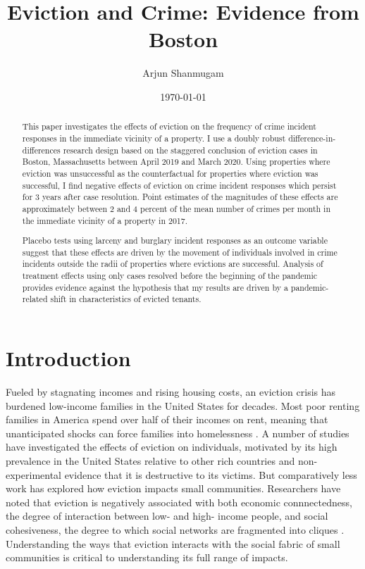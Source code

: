 \documentclass[12pt]{article}
\begin{document}
\begin{titlepage}
\title{Eviction and Crime: Evidence from Boston}
\author{Arjun Shanmugam}
\date{\today}
\maketitle
\begin{abstract}
\noindent This paper investigates the effects of eviction on the frequency of crime incident responses in the immediate vicinity of a property. I use a doubly robust difference-in-differences research design based on the staggered conclusion of eviction cases in Boston, Massachusetts between April 2019 and March 2020. Using properties where eviction was unsuccessful as the counterfactual for properties where eviction was successful, I find negative effects of eviction on crime incident responses which persist for 3 years after case resolution. Point estimates of the magnitudes of these effects are approximately between 2 and 4 percent of the mean number of crimes per month in the immediate vicinity of a property in 2017. 

Placebo tests using larceny and burglary incident responses as an outcome variable suggest that these effects are driven by the movement of individuals involved in crime incidents outside the radii of properties where evictions are successful. Analysis of treatment effects using only cases resolved before the beginning of the pandemic provides evidence against the hypothesis that my results are driven by a pandemic-related shift in characteristics of evicted tenants.


\bigskip
\end{abstract}
\setcounter{page}{0}
\thispagestyle{empty}
\end{titlepage}
\pagebreak \newpage

\doublespacing

\section{Introduction} \label{sec:introduction}
Fueled by stagnating incomes and rising housing costs, an eviction crisis has burdened low-income families in the United States for decades. Most poor renting families in America spend over half of their incomes on rent, meaning that unanticipated shocks can force families into homelessness \citep{desmond_evicted:_2017}. A number of studies have investigated the effects of eviction on individuals, motivated by its high prevalence in the United States relative to other rich countries \citep{oecd_affordable_housing_database_hc3.3._2021} and non-experimental evidence that it is destructive to its victims. But comparatively less work has explored how eviction impacts small communities. Researchers have noted that eviction is negatively associated with both economic connnectedness, the degree of interaction between low- and high- income people, and social cohesiveness, the degree to which social networks are fragmented into cliques \citep{weaver_no_2023, chetty_social_2022}. Understanding the ways that eviction interacts with the social fabric of small communities is critical to understanding its full range of impacts. 
\end{document}
